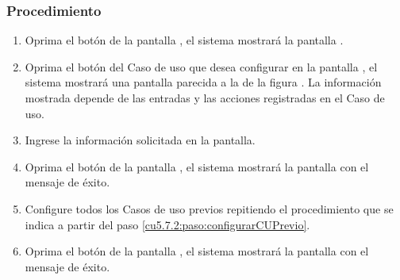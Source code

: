 \subsubsection{Procedimiento}
\begin{enumerate}
	\item Oprima el botón  de la pantalla , el sistema mostrará la pantalla . 

	
	\item Oprima el botón \btnConfigurarPrueba del Caso de uso que desea configurar en la pantalla , 
	      el sistema mostrará una pantalla parecida a la de la figura . La información mostrada depende de las entradas y las acciones registradas en el Caso de uso. \label{cu5.7.2:paso:configurarCUPrevio}

	
	\item Ingrese la información solicitada en la pantalla.
	
	\item Oprima el botón  de la pantalla , el sistema mostrará la pantalla 
	       con el mensaje de éxito.
	      
	\item Configure todos los Casos de uso previos repitiendo el procedimiento que se indica a partir del paso \ref{cu5.7.2:paso:configurarCUPrevio}.
	
	\item Oprima el botón  de la pantalla , el sistema mostrará 
	      la pantalla  con el mensaje de éxito.
\end{enumerate}




